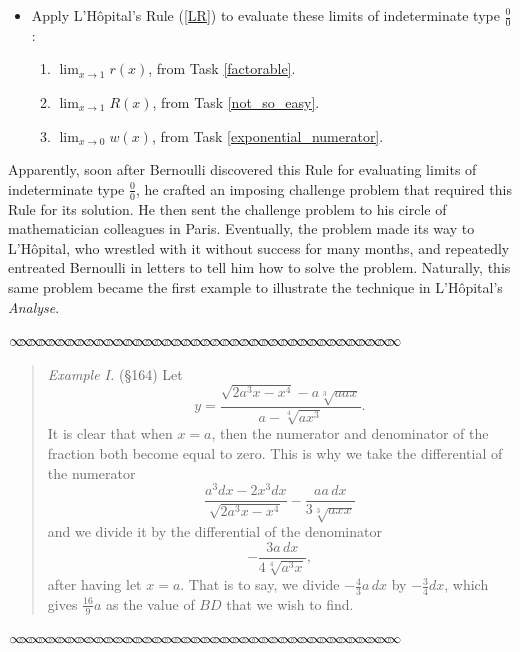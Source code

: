 \documentclass[11pt]{article}
\newcommand{\sep}{\vspace{-3pt}
\begin{center}
{\mathversion{normal}
$\infty \mspace{-5.5mu}\infty \mspace{-5.5mu}\infty \mspace{-5.5mu}\infty \mspace{-5.5mu}
\infty \mspace{-5.5mu}\infty \mspace{-5.5mu}\infty \mspace{-5.5mu}\infty \mspace{-5.5mu}
\infty \mspace{-5.5mu}\infty \mspace{-5.5mu}\infty \mspace{-5.5mu}\infty \mspace{-5.5mu}
\infty \mspace{-5.5mu}\infty \mspace{-5.5mu}\infty \mspace{-5.5mu}\infty \mspace{-5.5mu}
\infty \mspace{-5.5mu}\infty \mspace{-5.5mu}\infty \mspace{-5.5mu}\infty \mspace{-5.5mu}
\infty \mspace{-5.5mu}\infty \mspace{-5.5mu}\infty \mspace{-5.5mu}\infty \mspace{-5.5mu}
\infty \mspace{-5.5mu}\infty \mspace{-5.5mu}\infty \mspace{-5.5mu}\infty \mspace{-5.5mu}
\infty \mspace{-5.5mu}\infty \mspace{-5.5mu}\infty \mspace{-5.5mu}\infty \mspace{-5.5mu}
\infty \mspace{-5.5mu}\infty \mspace{-5.5mu}\infty \mspace{-5.5mu}\infty \mspace{-5.5mu}
\infty \mspace{-5.5mu}\infty \mspace{-5.5mu}\infty \mspace{-5.5mu}\infty \mspace{-5.5mu}$}
\end{center} \vspace*{-5pt}}
\newenvironment{source}%
 {\bigskip \sep \vspace*{-6pt} \begin{quote}
          \begin{sf}   }
   {   \end{sf}     \end{quote} \vspace*{-6pt} \sep \bigskip}%
\newcounter{tasknumb}
\newcommand{\tasknumb}[1]{\refstepcounter{tasknumb}\textmd{\textbf{$\fbox{$\fbox{Task \thetasknumb}$}$}}#1}
\newenvironment{task}[1][]%
 {\begin{itemize}
 \item[\tasknumb{#1}] }
{
    \end{itemize}    }%
\begin{document}
\begin{task}[\label{examples}]
Apply L'H\^opital's Rule (\ref{LR}) to evaluate these limits of indeterminate type ${\displaystyle \frac00}$:
\begin{enumerate}
\item[(a)] ${\displaystyle \lim_{x\to 1} r(x)}$, from Task \ref{factorable}. \\
\item[(b)] ${\displaystyle \lim_{x\to 1} R(x)}$, from Task \ref{not_so_easy}. \\
\item[(b)] ${\displaystyle \lim_{x\to 0} w(x)}$, from Task \ref{exponential_numerator}. \\
\end{enumerate}

\smallskip
\end{task}

Apparently, soon after Bernoulli discovered this Rule for evaluating limits of indeterminate type $\frac00$, he crafted an imposing challenge problem that required this Rule for its solution. He then sent the challenge problem to his circle of mathematician colleagues in Paris. Eventually, the problem made its way to L'H\^opital, who wrestled with it without success for many months, and repeatedly entreated Bernoulli in letters to tell him how to solve the problem. Naturally, this same problem became the first example to illustrate the technique in L'H\^opital's \emph{Analyse}.
\begin{source}
\emph{Example I.} (\S 164) Let $$y=\frac{\sqrt{2a^3x-x^4}-a\sqrt[3]{aax}}{a-\sqrt[4]{ax^3}}.$$It is clear that when $x=a$, then the numerator and denominator of the fraction both become equal to zero. This is why we take the differential of the numerator $$\frac{a^3dx-2x^3dx}{\sqrt{2a^3x-x^4}}-\frac{aa\,dx}{3\sqrt[3]{axx}}$$and we divide it by the differential of the denominator$$-\frac{3a\,dx}{4\sqrt[4]{a^3x}},$$after having let $x=a$. That is to say, we divide $-\frac43 a\,dx$ by $-\frac34 dx$, which gives $\frac{16}{9}a$ as the value of $BD$ that we wish to find.
\end{source}
\end{document}
